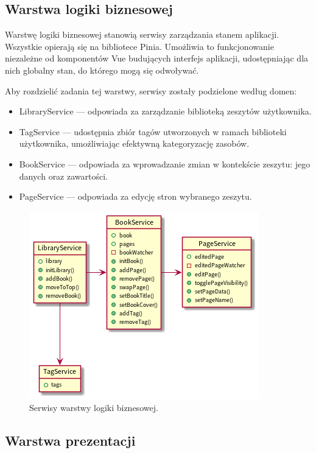 \subsection{Warstwa logiki biznesowej}
Warstwę logiki biznesowej stanowią serwisy zarządzania stanem aplikacji.
Wszystkie opierają się na bibliotece Pinia.
Umożliwia to funkcjonowanie niezależne od komponentów Vue budujących interfejs aplikacji,
udostępniając dla nich globalny stan, do którego mogą się odwoływać.

Aby rozdzielić zadania tej warstwy, serwisy zostały podzielone według domen:
\begin{itemize}
	\item LibraryService — odpowiada za zarządzanie biblioteką zeszytów użytkownika.
	\item TagService — udostępnia zbiór tagów utworzonych w ramach biblioteki użytkownika, umożliwiając efektywną kategoryzację zasobów.
	\item BookService — odpowiada za wprowadzanie zmian w kontekście zeszytu: jego danych oraz zawartości.
	\item PageService — odpowiada za edycję stron wybranego zeszytu.
\end{itemize}

\begin{figure}[H]
	\begin{center}
		\includegraphics[scale=0.9]{media/LogicLayer.png}
	\end{center}
	\caption{Serwisy warstwy logiki biznesowej.}
	\label{rys:logic-layer}
\end{figure}


\subsection{Warstwa prezentacji}
